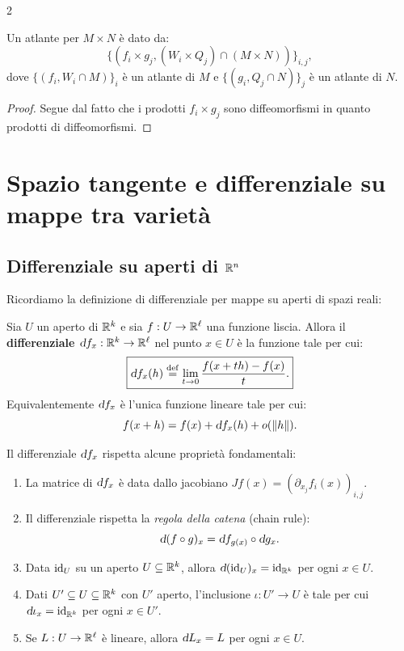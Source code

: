 \begin{multicols*}{2}
\begin{proposition}
        Un atlante per $M \times N$ è dato da:
        \[ \{(f_i \times g_j, (W_i \times Q_j) \cap (M \times N))\}_{i, j}, \]
        dove $\{(f_i, W_i \cap M)\}_i$ è un atlante di $M$
        e $\{(g_i, Q_j \cap N)\}_j$ è un atlante di $N$.
    \end{proposition}

    \begin{proof}
        Segue dal fatto che i prodotti $f_i \times g_j$ sono diffeomorfismi in quanto prodotti
        di diffeomorfismi.
    \end{proof}

    \section{Spazio tangente e differenziale su mappe tra varietà}

    \subsection{Differenziale su aperti di \texorpdfstring{$\mathbb{R}^n$}{ℝⁿ}}

    Ricordiamo la definizione di differenziale per mappe su aperti di spazi reali:

    \begin{definition}
        Sia $U$ un aperto di $\mathbb{R}^k$ e sia $f : U \to \mathbb{R}^\ell$ una funzione liscia.
        Allora il \textbf{differenziale $\dif f_x : \RR^k \to \RR^\ell$} nel
        punto $x \in U$ è la funzione tale per cui:
        \[
            \boxed{\dif f_x(h) \defeq \lim_{t \to 0} \frac{f(x+th) - f(x)}{t}.}
        \]
        Equivalentemente $\dif f_x$ è l'unica funzione lineare tale per cui:
        \[
            f(x+h) = f(x) + \dif f_x(h) + o(\norm{h}).
        \]
    \end{definition}

    \begin{remark}
        Il differenziale $\dif f_x$ rispetta alcune proprietà fondamentali:
        \begin{enumerate}[(i.)]
            \item La matrice di $\dif f_x$ è data dallo jacobiano $Jf(x) = (\partial_{x_j} f_i(x))_{i, j}$.
            \item Il differenziale rispetta la \textit{regola della catena} (chain rule):
                  \[ \dif(f \circ g)_x = \dif f_{g(x)} \circ \dif g_x. \]
            \item Data $\operatorname{id}_U$ su un aperto $U \subseteq \mathbb{R}^k$, allora $\dif (\id_U)_x = \id_{\RR^k}$ per ogni $x \in U$.
            \item Dati $U' \subseteq U \subseteq \mathbb{R}^k$ con $U'$ aperto, l'inclusione $\iota : U' \to U$ è tale per cui
                  $\dif \iota_x = \id_{\RR^k}$ per ogni $x \in U'$.
            \item Se $L : U \to \mathbb{R}^\ell$ è lineare, allora $\dif L_x = L$ per ogni $x \in U$.
        \end{enumerate}
    \end{remark}


\end{multicols*}
